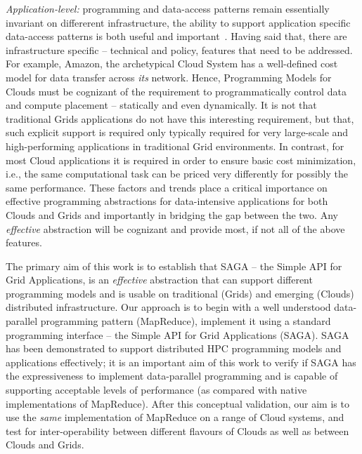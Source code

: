 \documentclass[conference,final]{IEEEtran}
\newcommand{\jhanote}[1]{ {\textcolor{red} { ***SJ: #1 }}}
\newcommand{\jhanote}[1]{}
\begin{document}
{\it Application-level:} programming and data-access patterns remain
essentially invariant on differerent infrastructure, the ability to
support application specific data-access patterns is both useful and
important~\cite{dpa-paper}.  Having said that, there are
infrastructure specific -- technical and policy, features that need to
be addressed. For example, Amazon, the archetypical Cloud System has a
well-defined cost model for data transfer across {\it its}
network. Hence, Programming Models for Clouds must be cognizant of the
requirement to programmatically control data and compute placement --
statically and even dynamically.  It is not that traditional Grids
applications do not have this interesting requirement, but that, such
explicit support is required only typically required for very
large-scale and high-performing applications in traditional Grid
environments. In contrast, for most Cloud applications it is required
in order to ensure basic cost minimization, i.e., the same
computational task can be priced very differently for possibly the
same performance.  These factors and trends place a critical
importance on effective programming abstractions for data-intensive
applications for both Clouds and Grids and importantly in bridging the
gap between the two.  Any {\it effective} abstraction will be
cognizant and provide most, if not all of the above features.

The primary aim of this work is to establish that SAGA -- the Simple
API for Grid Applications, is an {\it effective} abstraction that can
support different programming models and is usable on traditional
(Grids) and emerging (Clouds) distributed infrastructure.  Our
approach is to begin with a well understood data-parallel programming
pattern (MapReduce), implement it using a standard programming interface
-- the Simple API for Grid Applications (SAGA).  SAGA has been
demonstrated to support distributed HPC programming models and
applications effectively; it is an important aim of this work to
verify if SAGA has the expressiveness to implement data-parallel
programming and is capable of supporting acceptable levels of
performance (as compared with native implementations of
MapReduce). After this conceptual validation, our aim is to use the
{\it same} implementation of MapReduce on a range of Cloud systems,
and test for inter-operability between different flavours of Clouds as
well as between Clouds and Grids.


\end{document}
